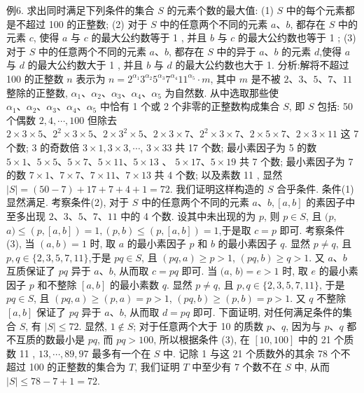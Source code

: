 例6. 求出同时满足下列条件的集合 $S$ 的元素个数的最大值:
(1) $S$ 中的每个元素都是不超过 100 的正整数;
(2) 对于 $S$ 中的任意两个不同的元素 $a 、 b$, 都存在 $S$ 中的元素 $c$, 使得 $a$ 与 $c$ 的最大公约数等于 1 , 并且 $b$ 与 $c$ 的最大公约数也等于 1 ;
(3) 对于 $S$ 中的任意两个不同的元素 $a 、 b$, 都存在 $S$ 中的异于 $a 、 b$ 的元素 $d$,使得 $a$ 与 $d$ 的最大公约数大于 1 , 并且 $b$ 与 $d$ 的最大公约数也大于 1. 
分析:解将不超过 100 的正整数 $n$ 表示为 $n=2^{\alpha_1} 3^{\alpha_2} 5^{\alpha_3} 7^{\alpha_4} 11^{\alpha_5} \cdot m$, 其中 $m$ 是不被 $2 、 3 、 5 、 7 、 11$ 整除的正整数, $\alpha_1 、 \alpha_2 、 \alpha_3 、 \alpha_4 、 \alpha_5$ 为自然数.
从中选取那些使 $\alpha_1 、 \alpha_2 、 \alpha_3 、 \alpha_4 、 \alpha_5$ 中恰有 1 个或 2 个非零的正整数构成集合 $S$, 即 $S$ 包括: 50 个偶数 $2,4, \cdots, 100$ 但除去 $2 \times 3 \times 5 、 2^2 \times 3 \times 5 、 2 \times 3^2 \times 5 、 2 \times 3 \times 7 、 2^2 \times 3 \times 7 、 2 \times 5 \times 7 、 2 \times 3 \times 11$ 这 7 个数; 3 的奇数倍 $3 \times 1,3 \times 3, \cdots$, $3 \times 33$ 共 17 个数; 最小素因子为 5 的数 $5 \times 1 、 5 \times 5 、 5 \times 7 、 5 \times 11 、 5 \times 13$ 、 $5 \times 17 、 5 \times 19$ 共 7 个数; 最小素因子为 7 的数 $7 \times 1 、 7 \times 7 、 7 \times 11 、 7 \times 13$ 共 4 个数; 以及素数 11 , 显然 $|S|=(50-7)+17+7+4+1=72$. 我们证明这样构造的 $S$ 合乎条件.
条件(1)显然满足.
考察条件(2), 对于 $S$ 中的任意两个不同的元素 $a 、 b,[a, b]$ 的素因子中至多出现 $2 、 3 、 5 、 7 、 11$ 中的 4 个数.
设其中未出现的为 $p$, 则 $p \in S$, 且 $(p$, $a) \leqslant(p,[a, b])=1,(p, b) \leqslant(p,[a, b])=1$,于是取 $c=p$ 即可.
考察条件 (3), 当 $(a, b)=1$ 时, 取 $a$ 的最小素因子 $p$ 和 $b$ 的最小素因子 $q$. 显然 $p \neq q$, 且 $p, q \in\{2,3,5,7,11\}$,于是 $p q \in S$, 且 $(p q, a) \geqslant p>1$, $(p q, b) \geqslant q>1$. 又 $a 、 b$ 互质保证了 $p q$ 异于 $a 、 b$, 从而取 $c=p q$ 即可.
当 $(a$, $b)=e>1$ 时, 取 $e$ 的最小素因子 $p$ 和不整除 $[a, b]$ 的最小素数 $q$. 显然 $p \neq q$, 且 $p, q \in\{2,3,5,7,11\}$, 于是 $p q \in S$, 且 $(p q, a) \geqslant(p, a)=p>1$, $(p q, b) \geqslant(p, b)=p>1$. 又 $q$ 不整除 $[a, b]$ 保证了 $p q$ 异于 $a 、 b$, 从而取 $d=p q$ 即可.
下面证明, 对任何满足条件的集合 $S$, 有 $|S| \leqslant 72$.
显然, $1 \notin S$; 对于任意两个大于 10 的质数 $p 、 q$, 因为与 $p 、 q$ 都不互质的数最小是 $p q$, 而 $p q>100$, 所以根据条件 (3), 在 $[10,100]$ 中的 21 个质数 11 , $13, \cdots, 89,97$ 最多有一个在 $S$ 中.
记除 1 与这 21 个质数外的其余 78 个不超过 100 的正整数的集合为 $T$, 我们证明 $T$ 中至少有 7 个数不在 $S$ 中, 从而 $|S| \leqslant 78-7+1=72$.
